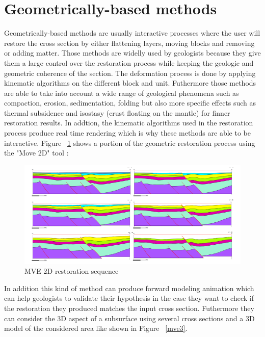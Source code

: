 \documentclass[12pt, a4paper]{report} %
\begin{document}
\section{Geometrically-based methods}

Geometrically-based methods are usually interactive processes where the user will restore the cross section by either flattening layers, moving blocks and removing or adding matter.
Those methods are widelly used by geologists because they give them a large control over the restoration process while keeping the geologic and geometric coherence of the section.  The deformation process is done by applying  kinematic algorithms on the different block and unit. Futhermore those methods are able to take into account a wide range of geological phenomena such as compaction, erosion, sedimentation, folding but also more specific effects such as thermal subsidence and isostasy (crust floating on the mantle) \cite{Isostasy} for finner restoration results. In addtion, the kinematic algorithms used in the restoration process produce real time rendering which is why these methods are able to be interactive.
Figure ~\ref{mve} shows a portion of the geometric restoration process using the "Move 2D" tool \cite{Move}:

\begin{figure}[H]
	\centering
	\includegraphics[scale=3]{mve2D.png}
	\caption{MVE 2D restoration sequence}
	\label{mve}
\end{figure}

In addition this kind of method can produce forward modeling animation which can help geologists to validate their hypothesis in the case they want to check if the restoration they produced matches the input cross section. Futhermore they can consider the 3D aspect of a subsurface using several cross sections and a 3D model of the considered area like shown in Figure ~\ref{mve3}.
\end{document}
